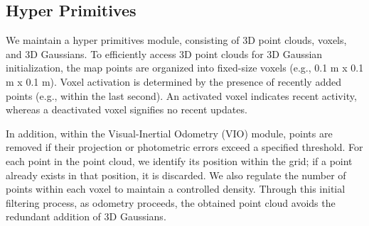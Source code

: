 \documentclass[lettersize,journal]{IEEEtran}
\begin{document}
\subsection{Hyper Primitives}

We maintain a hyper primitives module, consisting of 3D point clouds, voxels, and 3D Gaussians. To efficiently access 3D point clouds for 3D Gaussian initialization, the map points are organized into fixed-size voxels (e.g., 0.1 m x 0.1 m x 0.1 m). Voxel activation is determined by the presence of recently added points (e.g., within the last second). An activated voxel indicates recent activity, whereas a deactivated voxel signifies no recent updates.

In addition, within the Visual-Inertial Odometry (VIO) module, points are removed if their projection or photometric errors exceed a specified threshold\cite{r3live}. For each point in the point cloud, we identify its position within the grid; if a point already exists in that position, it is discarded. We also regulate the number of points within each voxel to maintain a controlled density. Through this initial filtering process, as odometry proceeds, the obtained point cloud avoids the redundant addition of 3D Gaussians.
\end{document}
